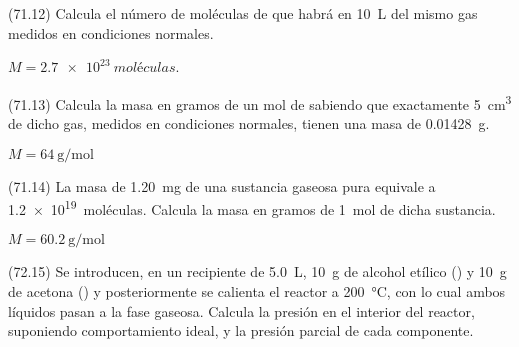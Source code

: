     \begin{exercise}[
        tags    = {},
        topics  = {química,química básica},
        source  = {FQ 1B MGH 2016, p71, e12},
      ]
      (71.12) Calcula el número de moléculas de  que habrá en \SI{10}{\liter} del mismo gas medidos en condiciones normales.
    \end{exercise}

    \begin{solution}
      \( M = \SI{2,7e23}{moléculas} \).
    \end{solution}




    \begin{exercise}[
        tags    = {},
        topics  = {química,química básica},
        source  = {FQ 1B MGH 2016, p71, e13},
      ]
      (71.13) Calcula la masa en gramos de un mol de  sabiendo que
      exactamente \SI{5}{\cubic\centi\meter} de dicho gas, medidos en condiciones
      normales, tienen una masa de \SI{0,01428}{\gram}.
    \end{exercise}

    \begin{solution}
      \( M = \SI{64}{\gram\per\mole} \)
    \end{solution}




    \begin{exercise}[
        tags    = {},
        topics  = {química,química básica},
        source  = {FQ 1B MGH 2016, p71, e14},
      ]
      (71.14) La masa de \SI{1,20}{\milli\gram} de una sustancia gaseosa pura equivale
      a \SI{1,2e19}{moléculas}. Calcula la masa en gramos de \SI{1}{\mole} de dicha sustancia.
    \end{exercise}

    \begin{solution}
      \( M = \SI{60,2}{\gram\per\mole} \)
    \end{solution}




    \begin{exercise}[
        tags    = {},
        topics  = {química,química básica},
        source  = {FQ 1B MGH 2016, p72, e15},
      ]
      (72.15) Se introducen, en un recipiente de \SI{5.0}{\liter}, \SI{10}{\gram} de alcohol etílico () y \SI{10}{\gram} de acetona () y posteriormente se calienta el reactor a \SI{200}{\celsius}, con lo cual ambos líquidos pasan a la fase gaseosa. Calcula la presión en el interior del reactor, suponiendo comportamiento ideal, y la presión parcial de cada componente.
    \end{exercise}

